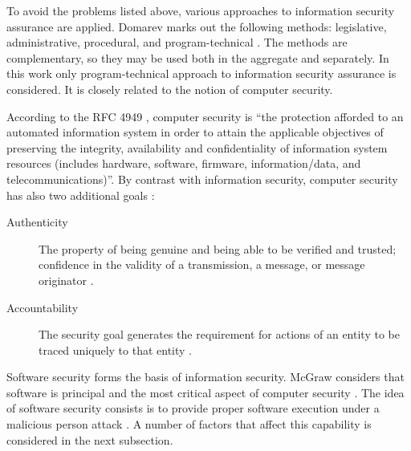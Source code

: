 %
To avoid the problems listed above, various approaches to information security assurance are applied. 
%
Domarev marks out the following methods: legislative, administrative, procedural, and program-technical . 
%
The methods are complementary, so they may be used both in the aggregate and separately. 
%
In this work only program-technical approach to information security assurance is considered. 
%
It is closely related to the notion of computer security. 

%
According to the RFC 4949 , computer security is ``the protection afforded to an automated information system in order to attain the applicable objectives of preserving the integrity, availability and confidentiality of information system resources (includes hardware, software, firmware, information/data, and telecommunications)''. 
%
By contrast with information security, computer security has also two additional goals : 
%
\begin{description}
	\item[Authenticity] The property of being genuine and being able to be verified and trusted; confidence in the validity of a transmission, a message, or message originator .
	\item[Accountability] The security goal generates the requirement for actions of an entity to be traced uniquely to that entity .
\end{description}

%
Software security forms the basis of information security. 
%
McGraw considers that software is principal and the most critical aspect of computer security . 
%
The idea of software security consists is to provide proper software execution under a malicious person attack . 
%
A number of factors that affect this capability is considered in the next subsection. 